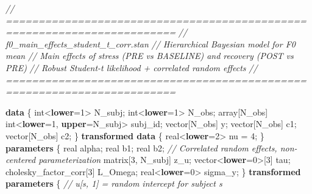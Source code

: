 \documentclass[
  english,
  man,floatsintext]{apa6}
\newenvironment{Shaded}{\begin{snugshade}}{\end{snugshade}}
\newcommand{\CommentTok}[1]{\textcolor[rgb]{0.56,0.35,0.01}{\textit{#1}}}
\newcommand{\DataTypeTok}[1]{\textcolor[rgb]{0.13,0.29,0.53}{#1}}
\newcommand{\DecValTok}[1]{\textcolor[rgb]{0.00,0.00,0.81}{#1}}
\newcommand{\KeywordTok}[1]{\textcolor[rgb]{0.13,0.29,0.53}{\textbf{#1}}}
\newcommand{\NormalTok}[1]{#1}
\begin{document}
\begin{Shaded}
\begin{Highlighting}[]
\CommentTok{// ========================================================================}
\CommentTok{// f0\_main\_effects\_student\_t\_corr.stan}
\CommentTok{// Hierarchical Bayesian model for F0 mean}
\CommentTok{// Main effects of stress (PRE vs BASELINE) and recovery (POST vs PRE)}
\CommentTok{// Robust Student{-}t likelihood + correlated random effects}
\CommentTok{// ========================================================================}

\KeywordTok{data}\NormalTok{ \{}
  \DataTypeTok{int}\NormalTok{\textless{}}\KeywordTok{lower}\NormalTok{=}\DecValTok{1}\NormalTok{\textgreater{} N\_subj;                              }
  \DataTypeTok{int}\NormalTok{\textless{}}\KeywordTok{lower}\NormalTok{=}\DecValTok{1}\NormalTok{\textgreater{} N\_obs;                              }
  \DataTypeTok{array}\NormalTok{[N\_obs] }\DataTypeTok{int}\NormalTok{\textless{}}\KeywordTok{lower}\NormalTok{=}\DecValTok{1}\NormalTok{, }\KeywordTok{upper}\NormalTok{=N\_subj\textgreater{} subj\_id;  }
  \DataTypeTok{vector}\NormalTok{[N\_obs] y;                                  }
  \DataTypeTok{vector}\NormalTok{[N\_obs] c1;                                }
  \DataTypeTok{vector}\NormalTok{[N\_obs] c2;                                 }
\NormalTok{\}}
\KeywordTok{transformed data}\NormalTok{ \{}
  \DataTypeTok{real}\NormalTok{\textless{}}\KeywordTok{lower}\NormalTok{=}\DecValTok{2}\NormalTok{\textgreater{} nu = }\DecValTok{4}\NormalTok{;                             }
\NormalTok{\}}
\KeywordTok{parameters}\NormalTok{ \{}
  \DataTypeTok{real}\NormalTok{ alpha;                                       }
  \DataTypeTok{real}\NormalTok{ b1;                                          }
  \DataTypeTok{real}\NormalTok{ b2;                                          }
  \CommentTok{// Correlated random effects, non{-}centered parameterization}
  \DataTypeTok{matrix}\NormalTok{[}\DecValTok{3}\NormalTok{, N\_subj] z\_u;                            }
  \DataTypeTok{vector}\NormalTok{\textless{}}\KeywordTok{lower}\NormalTok{=}\DecValTok{0}\NormalTok{\textgreater{}[}\DecValTok{3}\NormalTok{] tau;                           }
  \DataTypeTok{cholesky\_factor\_corr}\NormalTok{[}\DecValTok{3}\NormalTok{] L\_Omega;                  }
  \DataTypeTok{real}\NormalTok{\textless{}}\KeywordTok{lower}\NormalTok{=}\DecValTok{0}\NormalTok{\textgreater{} sigma\_y;                            }
\NormalTok{\}}
\KeywordTok{transformed parameters}\NormalTok{ \{}
  \CommentTok{// u[s, 1] = random intercept for subject s}

\end{Highlighting}
\end{Shaded}
\end{document}
